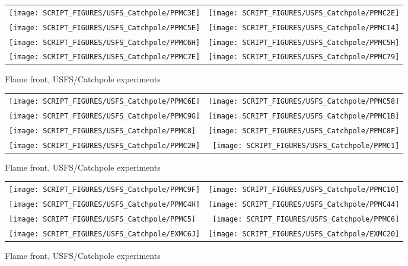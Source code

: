 \begin{figure}[p]
\begin{tabular*}{\textwidth}{l@{\extracolsep{\fill}}r}
\texttt{[image: SCRIPT\_FIGURES/USFS\_Catchpole/PPMC3E]} &
\texttt{[image: SCRIPT\_FIGURES/USFS\_Catchpole/PPMC2E]} \\
\texttt{[image: SCRIPT\_FIGURES/USFS\_Catchpole/PPMC5E]} &
\texttt{[image: SCRIPT\_FIGURES/USFS\_Catchpole/PPMC14]} \\
\texttt{[image: SCRIPT\_FIGURES/USFS\_Catchpole/PPMC6H]} &
\texttt{[image: SCRIPT\_FIGURES/USFS\_Catchpole/PPMC5H]} \\
\texttt{[image: SCRIPT\_FIGURES/USFS\_Catchpole/PPMC7E]} &
\texttt{[image: SCRIPT\_FIGURES/USFS\_Catchpole/PPMC79]} \\
\end{tabular*}
\caption[Flame front, USFS/Catchpole experiments]{Flame front, USFS/Catchpole experiments}
\label{USFS_Catchpole_232}
\end{figure}

\begin{figure}[p]
\begin{tabular*}{\textwidth}{l@{\extracolsep{\fill}}r}
\texttt{[image: SCRIPT\_FIGURES/USFS\_Catchpole/PPMC6E]} &
\texttt{[image: SCRIPT\_FIGURES/USFS\_Catchpole/PPMC58]} \\
\texttt{[image: SCRIPT\_FIGURES/USFS\_Catchpole/PPMC9G]} &
\texttt{[image: SCRIPT\_FIGURES/USFS\_Catchpole/PPMC1B]} \\
\texttt{[image: SCRIPT\_FIGURES/USFS\_Catchpole/PPMC8]} &
\texttt{[image: SCRIPT\_FIGURES/USFS\_Catchpole/PPMC8F]} \\
\texttt{[image: SCRIPT\_FIGURES/USFS\_Catchpole/PPMC2H]} &
\texttt{[image: SCRIPT\_FIGURES/USFS\_Catchpole/PPMC1]} \\
\end{tabular*}
\caption[Flame front, USFS/Catchpole experiments]{Flame front, USFS/Catchpole experiments}
\label{USFS_Catchpole_240}
\end{figure}

\begin{figure}[p]
\begin{tabular*}{\textwidth}{l@{\extracolsep{\fill}}r}
\texttt{[image: SCRIPT\_FIGURES/USFS\_Catchpole/PPMC9F]} &
\texttt{[image: SCRIPT\_FIGURES/USFS\_Catchpole/PPMC10]} \\
\texttt{[image: SCRIPT\_FIGURES/USFS\_Catchpole/PPMC4H]} &
\texttt{[image: SCRIPT\_FIGURES/USFS\_Catchpole/PPMC44]} \\
\texttt{[image: SCRIPT\_FIGURES/USFS\_Catchpole/PPMC5]} &
\texttt{[image: SCRIPT\_FIGURES/USFS\_Catchpole/PPMC6]} \\
\texttt{[image: SCRIPT\_FIGURES/USFS\_Catchpole/EXMC6J]} &
\texttt{[image: SCRIPT\_FIGURES/USFS\_Catchpole/EXMC20]} \\
\end{tabular*}
\caption[Flame front, USFS/Catchpole experiments]{Flame front, USFS/Catchpole experiments}
\label{USFS_Catchpole_248}
\end{figure}

